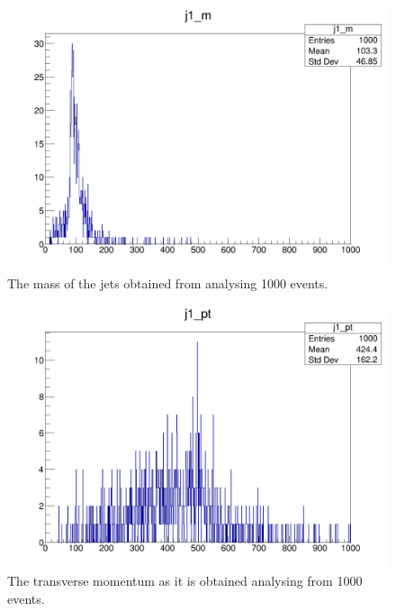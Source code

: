 \begin{figure}[hbtp]
\centering
\includegraphics[scale=.3]{images/mass.png}
\caption{The mass of the jets obtained from analysing 1000 events.}
\end{figure}

 
\begin{figure}[hbtp]
\centering
\includegraphics[scale=.3]{images/trnasverse.png}
\caption{The transverse momentum as it is obtained analysing from 1000 events.}
\end{figure}

